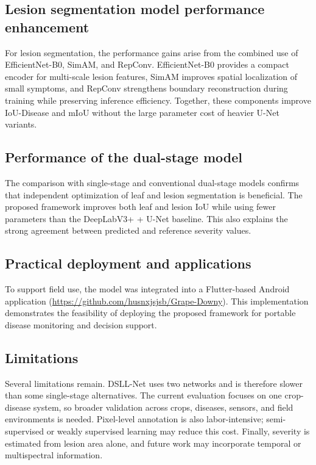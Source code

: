 \documentclass[
]{article}
\begin{document}
\hypertarget{lesion-segmentation-model-performance-enhancement}{%
\subsection{Lesion segmentation model performance
enhancement}\label{lesion-segmentation-model-performance-enhancement}}

For lesion segmentation, the performance gains arise from the combined
use of EfficientNet-B0, SimAM, and RepConv. EfficientNet-B0 provides a
compact encoder for multi-scale lesion features, SimAM improves spatial
localization of small symptoms, and RepConv strengthens boundary
reconstruction during training while preserving inference efficiency.
Together, these components improve IoU-Disease and mIoU without the
large parameter cost of heavier U-Net variants.

\hypertarget{performance-of-the-dual-stage-model}{%
\subsection{Performance of the dual-stage
model}\label{performance-of-the-dual-stage-model}}

The comparison with single-stage and conventional dual-stage models
confirms that independent optimization of leaf and lesion segmentation is
beneficial. The proposed framework improves both leaf and lesion IoU
while using fewer parameters than the DeepLabV3+ + U-Net baseline. This
also explains the strong agreement between predicted and reference
severity values.

\hypertarget{practical-deployment-and-applications}{%
\subsection{Practical deployment and
applications}\label{practical-deployment-and-applications}}

To support field use, the model was integrated into a Flutter-based
Android application (\url{https://github.com/husnxjsjsb/Grape-Downy}).
This implementation demonstrates the feasibility of deploying the
proposed framework for portable disease monitoring and decision support.

\hypertarget{limitations}{%
\subsection{Limitations}\label{limitations}}

Several limitations remain. DSLL-Net uses two networks and is therefore
slower than some single-stage alternatives. The current evaluation
focuses on one crop-disease system, so broader validation across crops,
diseases, sensors, and field environments is needed. Pixel-level
annotation is also labor-intensive; semi-supervised or weakly supervised
learning may reduce this cost. Finally, severity is estimated from lesion
area alone, and future work may incorporate temporal or multispectral
information.
\end{document}
